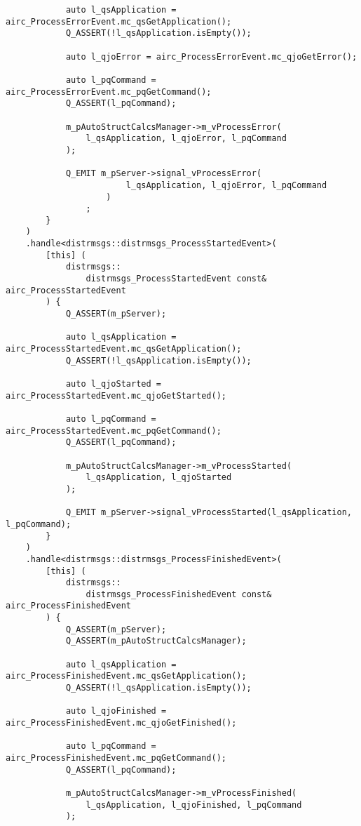 \begin{verbatim}
            auto l_qsApplication =  airc_ProcessErrorEvent.mc_qsGetApplication();
            Q_ASSERT(!l_qsApplication.isEmpty());

            auto l_qjoError = airc_ProcessErrorEvent.mc_qjoGetError();

            auto l_pqCommand = airc_ProcessErrorEvent.mc_pqGetCommand();
            Q_ASSERT(l_pqCommand);

            m_pAutoStructCalcsManager->m_vProcessError(
                l_qsApplication, l_qjoError, l_pqCommand
            );

            Q_EMIT m_pServer->signal_vProcessError(
                        l_qsApplication, l_qjoError, l_pqCommand
                    )
                ;
        }
    )
    .handle<distrmsgs::distrmsgs_ProcessStartedEvent>(
        [this] (
            distrmsgs::
                distrmsgs_ProcessStartedEvent const& airc_ProcessStartedEvent
        ) {
            Q_ASSERT(m_pServer);

            auto l_qsApplication =  airc_ProcessStartedEvent.mc_qsGetApplication();
            Q_ASSERT(!l_qsApplication.isEmpty());

            auto l_qjoStarted = airc_ProcessStartedEvent.mc_qjoGetStarted();

            auto l_pqCommand = airc_ProcessStartedEvent.mc_pqGetCommand();
            Q_ASSERT(l_pqCommand);

            m_pAutoStructCalcsManager->m_vProcessStarted(
                l_qsApplication, l_qjoStarted
            );

            Q_EMIT m_pServer->signal_vProcessStarted(l_qsApplication, l_pqCommand);
        }
    )
    .handle<distrmsgs::distrmsgs_ProcessFinishedEvent>(
        [this] (
            distrmsgs::
                distrmsgs_ProcessFinishedEvent const& airc_ProcessFinishedEvent
        ) {
            Q_ASSERT(m_pServer);
            Q_ASSERT(m_pAutoStructCalcsManager);

            auto l_qsApplication = airc_ProcessFinishedEvent.mc_qsGetApplication();
            Q_ASSERT(!l_qsApplication.isEmpty());

            auto l_qjoFinished = airc_ProcessFinishedEvent.mc_qjoGetFinished();

            auto l_pqCommand = airc_ProcessFinishedEvent.mc_pqGetCommand();
            Q_ASSERT(l_pqCommand);

            m_pAutoStructCalcsManager->m_vProcessFinished(
                l_qsApplication, l_qjoFinished, l_pqCommand
            );


\end{verbatim}
